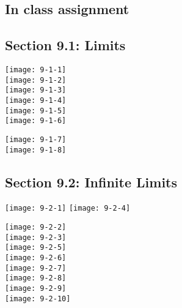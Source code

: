 \documentclass[14pt]{extarticle}
\begin{document}
\subsection{In class assignment}



\cleardoublepage
\subsection*{Section 9.1: Limits}

\texttt{[image: 9-1-1]} \\
\texttt{[image: 9-1-2]} \\
\texttt{[image: 9-1-3]} \\
\texttt{[image: 9-1-4]} \\
\texttt{[image: 9-1-5]} \\
\texttt{[image: 9-1-6]} \\
\begin{center}
\texttt{[image: 9-1-7]} \\
\texttt{[image: 9-1-8]} \\
\end{center}

\cleardoublepage
\subsection*{Section 9.2: Infinite Limits}
\texttt{[image: 9-2-1]}
\texttt{[image: 9-2-4]} 
\begin{center}
\texttt{[image: 9-2-2]} \\
\texttt{[image: 9-2-3]} \\
\texttt{[image: 9-2-5]} \\
\texttt{[image: 9-2-6]} \\
\texttt{[image: 9-2-7]} \\

\texttt{[image: 9-2-8]} \\
\texttt{[image: 9-2-9]} \\
\texttt{[image: 9-2-10]} \\
\end{center}
\end{document}
